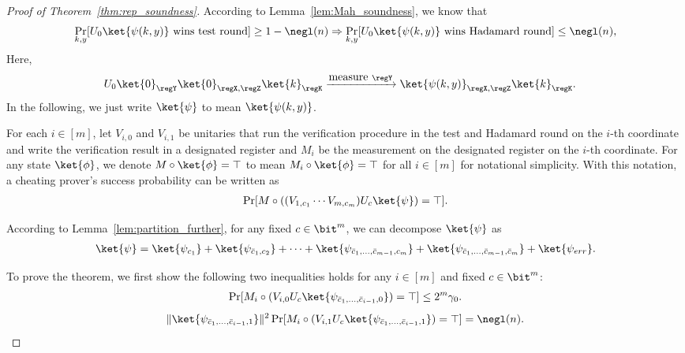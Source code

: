 \begin{proof}[Proof of Theorem~\ref{thm:rep_soundness}]

According to Lemma~\ref{lem:Mah_soundness}, we know that
\begin{align*}
    \Pr_{k,y}[U_{0}\ket{\psi(k,y)}\mbox{ wins test round}]\geq 1-\negl(n) \Rightarrow \Pr_{k,y}[U_{0}\ket{\psi(k,y)}\mbox{ wins Hadamard round}]\leq \negl(n),   
\end{align*}
Here,  
\begin{align*}
    &U_0\ket{0}_{\regY}\ket{0}_{\regX,\regZ}\ket{k}_{\regK} \xrightarrow{\mbox{measure }\regY} \ket{\psi(k,y)}_{\regX,\regZ}\ket{k}_{\regK}.
\end{align*}
In the following, we just write $\ket{\psi}$ to mean $\ket{\psi(k,y)}$.

For each $i\in [m]$, let $V_{i,0}$ and $V_{i,1}$ be unitaries that run the verification procedure in the test and Hadamard round on the $i$-th coordinate and write the verification result in a designated register and $M_i$ be the measurement on the designated register on the $i$-th coordinate.
For any state $\ket{\phi}$, we denote $M\circ \ket{\phi}=\top$ to mean $M_i\circ \ket{\phi}=\top$ for all $i\in[m]$ for notational simplicity. 
With this notation, a cheating prover's success probability can be written as 
\begin{align*}
    \Pr[M\circ\left((V_{1,c_1}\cdots V_{m,c_m})U_c\ket{\psi}\right) = \top].
\end{align*}

According to Lemma~\ref{lem:partition_further}, for any fixed $c\in \bit^{m}$, we can decompose $\ket{\psi}$ as 
\begin{align*}
    \ket{\psi} =  \ket{\psi_{c_1}}+ \ket{\psi_{\bar{c}_1,c_2}} + \cdots + \ket{\psi_{\bar{c}_1,\dots, \bar{c}_{m-1},c_{m}}} + \ket{\psi_{\bar{c}_1,\dots, \bar{c}_{m-1},\bar{c}_{m}}}+ \ket{\psi_{err}}.
\end{align*}

To prove the theorem, we first show the following two inequalities holds for any $i\in[m]$ and fixed $c\in \bit^{m}$:
\begin{align}
    \Pr[M_i\circ(V_{i,0}U_c\ket{\psi_{\bar{c}_1,\dots,\bar{c}_{i-1},0}}) = \top] \leq 2^{m}\gamma_{0}. \label{eq:Test}
\end{align}
\begin{align}
    \|\ket{\psi_{\bar{c}_1,\dots,\bar{c}_{i-1},1}}\|^2\Pr[M_i\circ(V_{i,1}U_c\ket{\psi_{\bar{c}_1,\dots,\bar{c}_{i-1},1}}) = \top] = \negl(n). \label{eq:Hada}
\end{align}


\end{proof}
